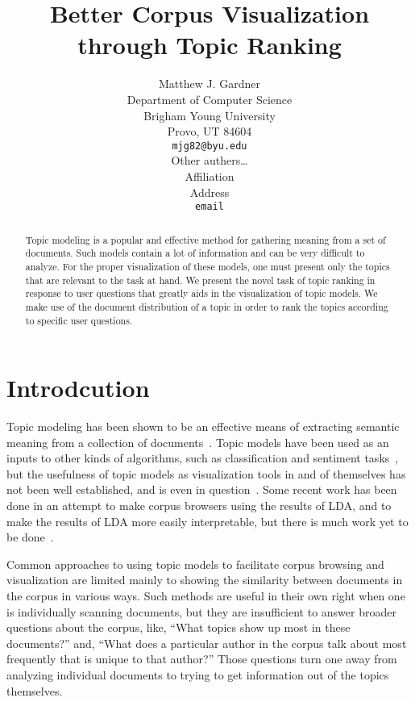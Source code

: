 \documentclass{article}
\title{Better Corpus Visualization through Topic Ranking}
\author{
Matthew J. Gardner \\
Department of Computer Science \\
Brigham Young University \\
Provo, UT 84604 \\
\texttt{mjg82@byu.edu} \\
\And
Other authers\ldots \\
Affiliation \\
Address \\
\texttt{email} \\
}
\begin{document}
\maketitle

\begin{abstract}

Topic modeling is a popular and effective method for gathering meaning from a
set of documents.  Such models contain a lot of information and can be very
difficult to analyze.  For the proper visualization of these models, one must
present only the topics that are relevant to the task at hand.  We present the
novel task of topic ranking in response to user questions that greatly aids in
the visualization of topic models.  We make use of the document distribution of
a topic in order to rank the topics according to specific user questions.

\end{abstract}

\section{Introdcution}
\label{sec:introduction}

Topic modeling has been shown to be an effective means of extracting semantic
meaning from a collection of
documents~\cite{griffiths-2004-finding-scientific-topics}.  Topic models have
been used as an inputs to other kinds of algorithms, such as classification and
sentiment tasks~\cite{blei-2003-latent-dirichlet-allocation,
brody-2010-aspect-sentiment-model-for-reviews}, but the usefulness of topic
models as visualization tools in and of themselves has not been well
established, and is even in
question~\cite{newman-2010-visualizing-with-topic-maps}.  Some recent work has
been done in an attempt to make corpus browsers using the results of LDA, and
to make the results of LDA more easily interpretable, but there is much work
yet to be done~\cite{blei-arxiv-corpus-browser,
newman-2010-visualizing-with-topic-maps,
mei-2007-automatic-labeling-of-topic-models}.  

Common approaches to using topic models to facilitate corpus browsing and
visualization are limited mainly to showing the similarity between documents in
the corpus in various ways.  Such methods are useful in their own right when
one is individually scanning documents, but they are insufficient to answer
broader questions about the corpus, like, ``What topics show up most in these
documents?'' and, ``What does a particular author in the corpus talk about most
frequently that is unique to that author?''  Those questions turn one away from
analyzing individual documents to trying to get information out of the topics
themselves.
\end{document}
